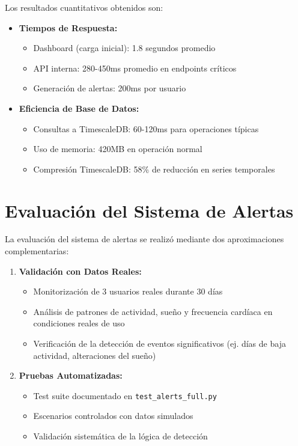 Los resultados cuantitativos obtenidos son:

\begin{itemize}
    \item \textbf{Tiempos de Respuesta:}
        \begin{itemize}
            \item Dashboard (carga inicial): 1.8 segundos promedio
            \item API interna: 280-450ms promedio en endpoints críticos
            \item Generación de alertas: 200ms por usuario
        \end{itemize}
    \item \textbf{Eficiencia de Base de Datos:}
        \begin{itemize}
            \item Consultas a TimescaleDB: 60-120ms para operaciones típicas
            \item Uso de memoria: 420MB en operación normal
            \item Compresión TimescaleDB: 58\% de reducción en series temporales
        \end{itemize}
\end{itemize}

\section{Evaluación del Sistema de Alertas}
\label{sec:evaluacion_alertas}

La evaluación del sistema de alertas se realizó mediante dos aproximaciones complementarias:

\begin{enumerate}
    \item \textbf{Validación con Datos Reales:}
        \begin{itemize}
            \item Monitorización de 3 usuarios reales durante 30 días
            \item Análisis de patrones de actividad, sueño y frecuencia cardíaca en condiciones reales de uso
            \item Verificación de la detección de eventos significativos (ej. días de baja actividad, alteraciones del sueño)
        \end{itemize}
    \item \textbf{Pruebas Automatizadas:}
        \begin{itemize}
            \item Test suite documentado en \texttt{test\_alerts\_full.py}
            \item Escenarios controlados con datos simulados
            \item Validación sistemática de la lógica de detección
        \end{itemize}
\end{enumerate}

